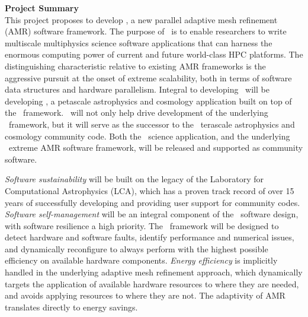 \documentclass[11pt,letterpaper]{article}
\begin{document}
\noindent
\textbf{Project Summary} \\

%
%
%
%
This project proposes to develop \cello, a new parallel adaptive mesh
refinement (AMR) software framework.  The purpose of \cello\ is to
enable researchers to write multiscale multiphysics science software
applications that can harness the enormous computing power of current
and future world-class HPC platforms.  The distinguishing
characteristic relative to existing AMR frameworks is the aggressive
pursuit at the onset of extreme scalability, both in terms of software
data structures and hardware parallelism.
%
Integral to developing \cello\ will be developing \enzoii, a petascale
astrophysics and cosmology application built on top of the \cello\
framework.  \enzoii\ will not only help drive development of the
underlying \cello\ framework, but it will serve as the successor to
the \enzo\ terascale astrophysics and cosmology community code.  Both
the \enzoii\ science application, and the underlying \cello\ extreme
AMR software framework, will be released and supported as community
software.

\textit{Software sustainability} will be built on the legacy of the
Laboratory for Computational Astrophysics (LCA), which has a proven
track record of over 15 years of successfully developing and providing
user support for community codes.
%
\textit{Software self-management} will be an integral component of the
\cello\ software design, with software resilience a high priority.
%
The \cello\ framework will be designed to detect hardware and software
faults, identify performance and numerical issues, and dynamically
reconfigure to always perform with the highest possible efficiency on
available hardware components.
%
\textit{Energy efficiency} is implicitly handled in the underlying
adaptive mesh refinement approach, which dynamically targets the
application of available hardware resources to where they are needed,
and avoids applying resources to where they are not.  The adaptivity
of AMR translates directly to energy savings.

\end{document}
